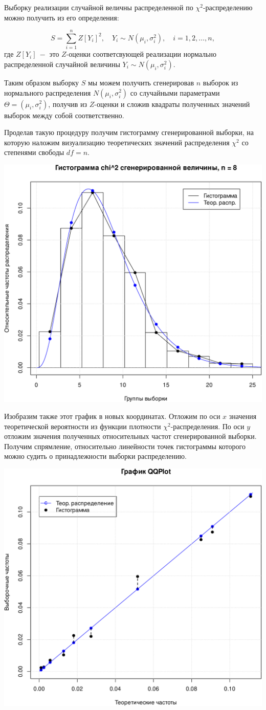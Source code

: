 \documentclass[
]{article}
\begin{document}
Выборку реализации случайной величны распределенной по
\(\chi^2\)-распределению можно получить из его определения:

\[
S = \sum_{i=1}^{n} Z[Y_i]^2,\quad  Y_i \sim N(\mu_i, \sigma_i^2), \quad i=1,2,\dots,n,
\] где \(Z[Y_i]\ -\) это \(Z\)-оценки соответсвующей реализации
нормально распределенной случайной величины
\(Y_i \sim N(\mu_i, \sigma_i^2)\).

Таким образом выборку \(S\) мы можем получить сгенерировав \(n\) выборок
из нормального распределения \(N(\mu_i, \sigma_i^2)\) со случайными
параметрами \(\Theta = (\mu_i, \sigma_i^2)\), получив из \(Z\)-оценки и
сложив квадраты полученных значений выборок между собой соответственно.

Проделав такую процедуру получим гистограмму сгенерированной выборки, на
которую наложим визуализацию теоретических значений распределения
\(\chi^2\) со степенями свободы \(df = n\).

\begin{center}\includegraphics[width=0.6\linewidth]{Prac4_files/figure-latex/unnamed-chunk-5-1} \end{center}

Изобразим также этот график в новых координатах. Отложим по оси \(x\)
значения теоретической вероятности из функции плотности
\(\chi^2\)-распределения. По оси \(y\) отложим значения полученных
относительных частот сгенерированной выборки. Получим спрямление,
относительно линейности точек гистограммы которого можно судить о
принадлежности выборки распределению.

\begin{center}\includegraphics[width=0.6\linewidth]{Prac4_files/figure-latex/unnamed-chunk-6-1} \end{center}
\end{document}
